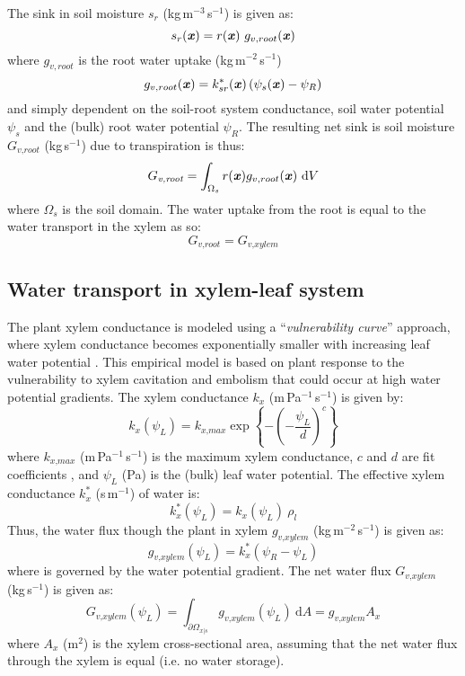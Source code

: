 The sink in soil moisture $s_r$ (kg\,m$^{-3}$\,s$^{-1}$) is given as:
\begin{equation}
s_r(\textbf{\textit{x}})  = r(\textbf{\textit{x}}) ~ g_{v,root}(\textbf{\textit{x}})
\end{equation}
where $g_{v,root}$ is the root water uptake (kg\,m$^{-2}$\,s$^{-1}$)
\begin{equation}
g_{v,root}(\textbf{\textit{x}})  = k_{sr}^*(\textbf{\textit{x}})  \left(\psi_s(\textbf{\textit{x}})  - \psi_R\right)
\end{equation}
and simply dependent on the soil-root system conductance, soil water potential $\psi_s$ and the (bulk) root water potential $\psi_R$. The resulting net sink is soil moisture $G_{\textit{v,root}}$ (kg\,s$^{-1}$) due to transpiration is thus:
\begin{equation}
G_{\textit{v,root}} = \int_{\Omega_s} r(\textbf{\textit{x}}) g_{v,root}(\textbf{\textit{x}})~\mathrm{d}V
\end{equation}
where $\Omega_s$ is the soil domain. The water uptake from the root is equal to the water transport in the xylem as so:
\begin{equation}
G_{\textit{v,root}} = G_{\textit{v,xylem}}
\end{equation}

\subsection{Water transport in xylem-leaf system}

The plant xylem conductance is modeled using a ``\textit{vulnerability curve}'' approach, where xylem conductance becomes exponentially smaller with increasing leaf water potential \citep{Volpe2013}. This empirical model is based on plant response to the vulnerability to xylem cavitation and embolism that could occur at high water potential gradients. The xylem conductance $k_x$ (m\,Pa$^{-1}$\,s$^{-1}$) is given by:
\begin{equation}
k_x(\psi_L) = k_{\textit{x,max}} \exp \left\{ - \left( - \frac{\psi_L}{d}\right)^c \right\}
\end{equation}
where $k_{\textit{x,max}}$ (m\,Pa$^{-1}$\,s$^{-1}$) is the maximum xylem conductance, $c$ and $d$ are fit coefficients \citep{Volpe2013}, and $\psi_L$ (Pa) is the (bulk) leaf water potential. The effective xylem conductance $k_x^*$ (s\,m$^{-1}$) of water is:
\begin{equation}
k_x^* (\psi_L)= k_x(\psi_L) ~ \rho_l
\end{equation}
Thus, the water flux though the plant in xylem $g_{\textit{v,xylem}}$ (kg\,m$^{-2}$\,s$^{-1}$) is given as:
\begin{equation}
g_{\textit{v,xylem}}(\psi_L) = k_x^* \left(\psi_R - \psi_L\right)
\end{equation}
where is governed by the water potential gradient. The net water flux $G_{\textit{v,xylem}}$  (kg\,s$^{-1}$) is given as:
\begin{equation}   
G_{\textit{v,xylem}}(\psi_L) = \int_{\partial\Omega_{x|s}} g_{\textit{v,xylem}}(\psi_L)~\mathrm{d}A = g_{\textit{v,xylem}} A_x
\end{equation}
where $A_x$ (m$^2$) is the xylem cross-sectional area, assuming that the net water flux through the xylem is equal (i.e. no water storage).

